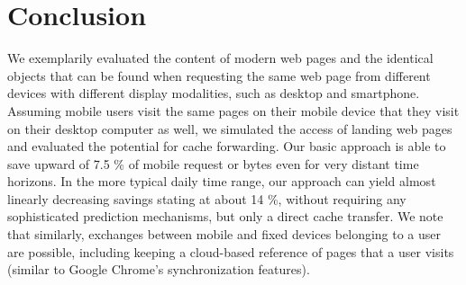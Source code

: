 \documentclass[letterpaper,conference]{IEEEtran}
\begin{document}
\section{Conclusion}
\label{s:conc}
We exemplarily evaluated the content of modern web pages and the identical objects that can be found when requesting the same web page from different devices with different display modalities, such as desktop and smartphone.
Assuming mobile users visit the same pages on their mobile device that they visit on their desktop computer as well, we simulated the access of landing web pages and evaluated the potential for cache forwarding.
Our basic approach is able to save upward of 7.5 \% of mobile request or bytes even for very distant time horizons.
In the more typical daily time range, our approach can yield almost linearly decreasing savings stating at about 14 \%, without requiring any sophisticated prediction mechanisms, but only a direct cache transfer.
We note that similarly, exchanges between mobile and fixed devices belonging to a user are possible, including keeping a cloud-based reference of pages that a user visits (similar to Google Chrome's synchronization features). %
\end{document}
